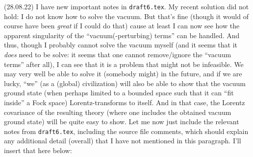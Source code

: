 \documentclass{report}
\begin{document}
(28.08.22) I have new important notes in \texttt{draft6.tex}. My recent solution did not hold: I do not know how to solve the vacuum. But that's fine (though it would of course have been \emph{great} if I could do that) cause at least I can now see how the apparent singularity of the ``vacuum(-perturbing) terms'' can be handled. And thus, though I probably cannot solve the vacuum myself (and it seems that it \emph{does} need to be solve: it seems that one cannot remove/ignore the ``vacuum terms'' after all), I can see that it is a problem that might not be infeasible. We may very well be able to solve it (somebody might) in the future, and if we are lucky, ``we'' (as a (global) civilization) will also be able to show that the vacuum ground state (when perhaps limited to a bounded space such that it can ``fit inside'' a Fock space) Lorentz-transforms to itself. And in that case, the Lorentz covariance of the resulting theory (where one includes the obtained vacuum ground state) will be quite easy to show. Let me now just include the relevant notes from \texttt{draft6.tex}, including the source file comments, which should explain any additional detail (overall) that I have not mentioned in this paragraph. I'll insert that here below:
\end{document}
